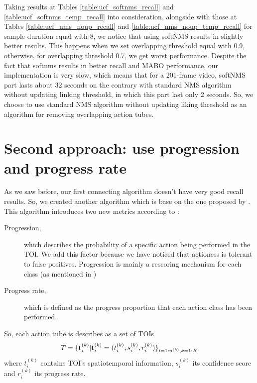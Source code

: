 Taking results at Tables \ref{table:ucf_softnms_recall} and \ref{table:ucf_softnms_temp_recall} into consideration, alongside with those
at Tables \ref{table:ucf_nms_noup_recall} and \ref{table:ucf_nms_noup_temp_recall} for sample duration equal with 8, we notice that
using softNMS results in slightly better results. This happens when we set overlapping threshold equal with 0.9, otherwise, for
overlapping threshold 0.7, we get worst performance. Despite the fact that softnms results in better recall and MABO performance,
our implementation is very slow, which means that for a 201-frame video, softNMS part lasts about 32 seconds on the contrary with
standard NMS algorithm without updating linking threshold, in which this part last only 2 seconds. So, we choose to use standard NMS
algorithm without updating liking threshold as an algorithm for  removing overlapping action tubes.

\section{Second approach: use progression and progress rate}
As we saw before, our first connecting algorithm doesn't have very good recall results. So, we created another algorithm which is base on
the one proposed by \cite{DBLP:journals/corr/abs-1903-00304}. This
algorithm introduces two new metrics according to \cite{DBLP:journals/corr/abs-1903-00304}:

\begin{description}
\item[ Progression,  ] which describes the probability of a specific action being performed in the TOI. 
  We add this factor because we have noticed that actioness is tolerant to false positives. Progression is
  mainly a rescoring mechanism for each class (as mentioned in \cite{DBLP:journals/corr/abs-1903-00304})

\item [ Progress rate, ] which is defined as the progress proportion that each action class has been performed.
  
\end{description}

So, each action tube is describes as a set of TOIs
\[  T = {\{ {\bf t}_i^{(k)} | {\bf t}_i^{(k)} = ( t_i^{(k)}, s_i^{(k)}, r_i^{(k)} ) \}}_{i=1:n^{(k)},k=1:K} \]
where $ t_i^{(k)} $ contains TOI's spatiotemporal information, $ s_i^{(k)} $ its confidence score and $ r_i^{(k)} $ its progress rate.

